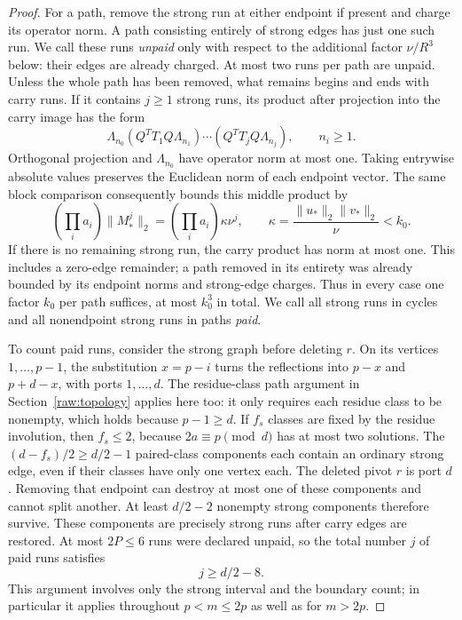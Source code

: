 \documentclass[11pt]{amsart}
\theoremstyle{definition}
\theoremstyle{remark}
\numberwithin{equation}{section}
\begin{document}
\begin{proof}
For a path, remove the strong run at either endpoint if present and
charge its operator norm.  A path consisting entirely of strong edges
has just one such run.  We call these runs \emph{unpaid} only with
respect to the additional factor $\nu/R^3$ below: their edges are
already charged.  At most two runs per path are unpaid.  Unless the
whole path has been removed, what remains begins and ends with carry
runs.  If it contains $j\ge1$ strong runs, its product after projection
into the carry image has the form
\[
 \Lambda_{n_0}(Q^TT_1Q\Lambda_{n_1})\cdots
                 (Q^TT_jQ\Lambda_{n_j}),\qquad n_i\ge1.
\]
Orthogonal projection and $\Lambda_{n_0}$ have operator norm at most
one.  Taking entrywise absolute values preserves the Euclidean norm
of each endpoint vector.  The same block comparison consequently bounds
this middle product by
\[
 \left(\prod_i a_i\right)\|M_*^j\|_2
 =\left(\prod_i a_i\right)\kappa\nu^j,
 \qquad \kappa=\frac{\|u_*\|_2\|v_*\|_2}{\nu}<k_0.
\]
If there is no remaining strong run, the carry product has norm at most
one.  This includes a zero-edge remainder; a path removed in its entirety
was already bounded by its endpoint norms and strong-edge charges.
Thus in every case one factor $k_0$ per path suffices, at most $k_0^3$
in total.  We call all strong runs in cycles and all nonendpoint strong
runs in paths \emph{paid}.

To count paid runs, consider the strong graph before deleting $r$.
On its vertices $1,\ldots,p-1$, the substitution $x=p-i$ turns the
reflections into $p-x$ and $p+d-x$, with ports $1,\ldots,d$.
The residue-class path argument in Section~\ref{raw:topology} applies
here too: it only requires each residue class to be nonempty, which
holds because $p-1\ge d$.  If $f_s$ classes are fixed by the residue
involution, then $f_s\le2$, because $2a\equiv p\pmod d$ has at most
two solutions.  The $(d-f_s)/2\ge d/2-1$ paired-class components
each contain an ordinary strong edge, even if their classes have only
one vertex each.  The deleted pivot $r$ is port $d$.  Removing that
endpoint can destroy at most one of these components and cannot split
another.  At least $d/2-2$ nonempty strong components therefore survive.
These components are precisely strong runs after carry edges are
restored.  At most $2P\le6$ runs were declared unpaid, so the total
number $j$ of paid runs satisfies
\begin{equation}\label{raw:paid-run-count}
 j\ge d/2-8.
\end{equation}
This argument involves only the strong interval and the boundary count;
in particular it applies throughout $p<m\le2p$ as well as for $m>2p$.


\end{proof}
\end{document}
